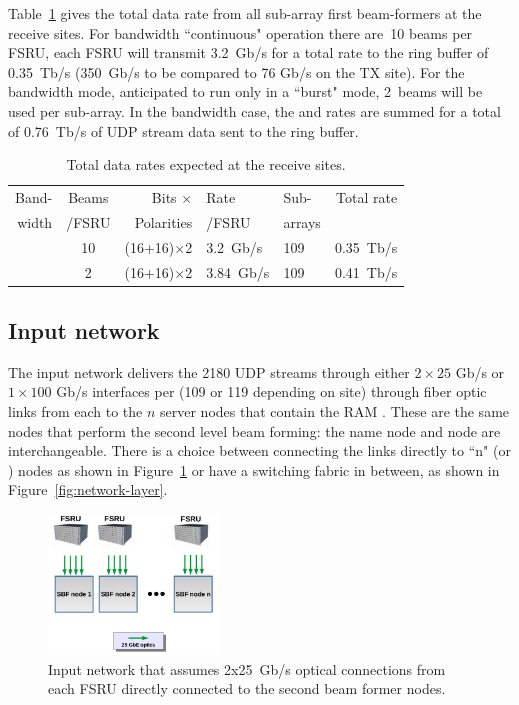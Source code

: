 \documentclass[12pt,a4paper]{article}
\begin{document}
Table~\ref{tab:rx:rates} gives the total data rate from all sub-array first beam-formers at the receive sites.
For \NBW{} bandwidth ``continuous" operation there are~10 beams per FSRU, each FSRU will transmit 3.2~Gb/s for a total rate to the ring buffer of 0.35~Tb/s (350~Gb/s to be compared to 76 Gb/s on the TX site).
For the \WBW{} bandwidth mode, anticipated to run only in a ``burst" mode, 
2~beams will be used per sub-array.
In the \WBW{} bandwidth case, the \WBW{} and \NBW{} rates are summed for a total of 0.76~Tb/s of UDP stream data sent to the ring buffer.
\begin{table}[h]
\centering
\begin{tabular}{rcrll|r}
{Band-} & {Beams} & {Bits $\times$}    & Rate    & Sub- & {Total rate} \\
{width} & {/FSRU} & {Polarities}       & {/FSRU} & arrays & \\ \hline
\NBW{}  & 10 & (16+16)$\times$2 & 3.2~Gb/s & 109 & 0.35~Tb/s \\
\WBW{} & 2 & (16+16)$\times$2 & 3.84~Gb/s & 109 & 0.41~Tb/s \\
\end{tabular}
\caption{Total data rates expected at the receive sites. \label{tab:rx:rates}}
\end{table}

\subsection{Input network}
\label{sec:inputnet}

The input network delivers the 2180 UDP streams through either $2 \times 25$ Gb/s or $1 \times 100$ Gb/s interfaces per \fsru (109 or 119 depending on site) through fiber optic links from each \fsru to the $n$ server nodes that contain the RAM \RB. 
These are the same nodes that perform the second level beam forming: the name \SBF node and \RB node are interchangeable.
There is a choice between connecting the \fsru links directly to ``n" \RB (or \SBF) nodes as shown in Figure~\ref{fig:inputnet-direct} or have a switching fabric in between, as shown in Figure~\ref{fig:network-layer}.
\begin{figure}
\centering
\includegraphics[width=0.4\textwidth]{input_network_7.png}
\caption{Input network that assumes 2x25~Gb/s optical connections from each FSRU directly connected to the second beam former nodes.
\label{fig:inputnet-direct}
}
\end{figure}
\end{document}
